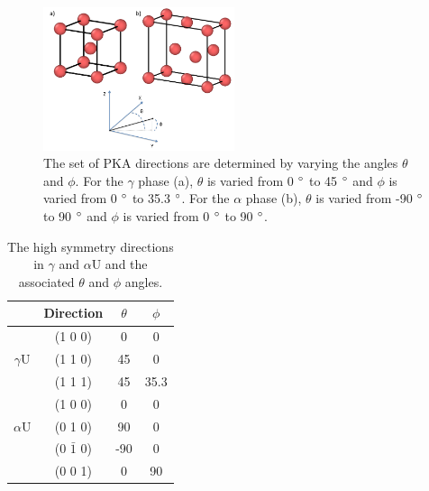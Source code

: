 \documentclass[review]{elsarticle}
\providecommand{\DIFaddtex}[1]{{\protect\color{blue} \sf #1}} %
\providecommand{\DIFaddFL}[1]{\DIFadd{#1}} %
\providecommand{\DIFaddbeginFL}{} %
\providecommand{\DIFaddendFL}{} %
\providecommand{\DIFdelbeginFL}{} %
\providecommand{\DIFdelendFL}{} %
\providecommand{\DIFadd}[1]{\texorpdfstring{\DIFaddtex{#1}}{#1}} %
\newcommand{\DIFscaledelfig}{0.5}
\newlength{\DIFdelgraphicswidth} %
\newlength{\DIFdelgraphicsheight} %
\newcommand{\DIFaddincludegraphics}[2][]{{\color{blue}\fbox{\DIFOincludegraphics[#1]{#2}}}} %
\newcommand{\DIFdelincludegraphics}[2][]{%
\sbox{\DIFdelgraphicsbox}{\DIFOincludegraphics[#1]{#2}}%
\settoboxwidth{\DIFdelgraphicswidth}{\DIFdelgraphicsbox} %
\settoboxtotalheight{\DIFdelgraphicsheight}{\DIFdelgraphicsbox} %
\scalebox{\DIFscaledelfig}{%
\parbox[b]{\DIFdelgraphicswidth}{\usebox{\DIFdelgraphicsbox}\\[-\baselineskip] \rule{\DIFdelgraphicswidth}{0em}}\llap{\resizebox{\DIFdelgraphicswidth}{\DIFdelgraphicsheight}{%
\setlength{\unitlength}{\DIFdelgraphicswidth}%
\begin{picture}(1,1)%
\thicklines\linethickness{2pt} %
{\color[rgb]{1,0,0}\put(0,0){\framebox(1,1){}}}%
{\color[rgb]{1,0,0}\put(0,0){\line( 1,1){1}}}%
{\color[rgb]{1,0,0}\put(0,1){\line(1,-1){1}}}%
\end{picture}%
}\hspace*{3pt}}} %
} %
\DeclareRobustCommand{\DIFaddbeginFL}{\DIFOaddbeginFL \let\includegraphics\DIFaddincludegraphics} %
\DeclareRobustCommand{\DIFaddendFL}{\DIFOaddendFL \let\includegraphics\DIFOincludegraphics} %
\DeclareRobustCommand{\DIFdelbeginFL}{\DIFOdelbeginFL \let\includegraphics\DIFdelincludegraphics} %
\DeclareRobustCommand{\DIFdelendFL}{\DIFOaddendFL \let\includegraphics\DIFOincludegraphics} %
\begin{document}
\begin{figure}[h]
 \centering
 \includegraphics[width=0.5\textwidth]{directionsC.png} 
 \caption{The set of PKA directions are determined by varying the angles $\theta$ and $\phi$. For the $\gamma$ phase (a), $\theta$ is varied from 0\DIFdelbeginFL %
\DIFdelendFL \DIFaddbeginFL \DIFaddFL{$\degree$ }\DIFaddendFL to 45\DIFdelbeginFL %
\DIFdelendFL \DIFaddbeginFL \DIFaddFL{$\degree$ }\DIFaddendFL and $\phi$ is varied from 0\DIFdelbeginFL %
\DIFdelendFL \DIFaddbeginFL \DIFaddFL{$\degree$ }\DIFaddendFL to 35.3\DIFdelbeginFL %
\DIFdelendFL \DIFaddbeginFL \DIFaddFL{$\degree$}\DIFaddendFL . For the $\alpha$ phase (b), $\theta$ is varied from -90\DIFdelbeginFL %
\DIFdelendFL \DIFaddbeginFL \DIFaddFL{$\degree$ }\DIFaddendFL to 90\DIFdelbeginFL %
\DIFdelendFL \DIFaddbeginFL \DIFaddFL{$\degree$ }\DIFaddendFL and $\phi$ is varied from 0\DIFdelbeginFL %
\DIFdelendFL \DIFaddbeginFL \DIFaddFL{$\degree$ }\DIFaddendFL to 90\DIFdelbeginFL %
\DIFdelendFL \DIFaddbeginFL \DIFaddFL{$\degree$}\DIFaddendFL .}
 \label{fig:directions}
\end{figure}

\begin{table}[h]
\caption{The high symmetry directions in $\gamma$ and $\alpha$U and the associated $\theta$ and $\phi$ angles.} \label{tab:dirs}
\begin{center}
\begin{tabular}{|c|c|c|c|}
	\hline
	& Direction & $\theta$ & $\phi$ \\
	 \hline
	 & (1 0 0) & 0 & 0 \\
	$\gamma$U & (1 1 0) & 45 & 0 \\
	& (1 1 1) & 45 & 35.3 \\
	 \hline
	 	 & (1 0 0) & 0 & 0 \\
	$\alpha$U & (0 1 0) & 90 & 0 \\
	& (0 $\bar{1}$ 0) & -90 & 0 \\
	& (0 0 1) & 0 & 90 \\
	 \hline
\end{tabular}
\end{center}
\label{default}
\end{table}
\end{document}
